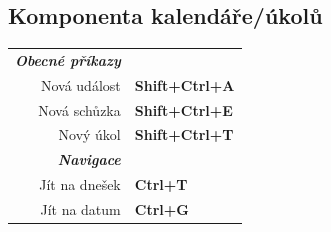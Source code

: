 \documentclass[12pt]{article}
\begin{document}
\begin{landscape}
\begin{center}
\begin{multicols}{2}
	\section*{Komponenta kalendáře/úkolů}
	\begin{tabular*}{4in}{rp{1.5in}}
		\textit{\textbf{Obecné příkazy}}	&					\\
		Nová událost				& \textbf{Shift+Ctrl+A}			\\
		Nová schůzka				& \textbf{Shift+Ctrl+E}			\\
		\vspace{1.5mm}
		Nový úkol				& \textbf{Shift+Ctrl+T}			\\
		\textit{\textbf{Navigace}}		&					\\
		Jít na dnešek				& \textbf{Ctrl+T}			\\
		Jít na datum				& \textbf{Ctrl+G}			\\
	\end{tabular*}
	\end{multicols}
	\end{center}
	\end{landscape}
 
\end{document}
